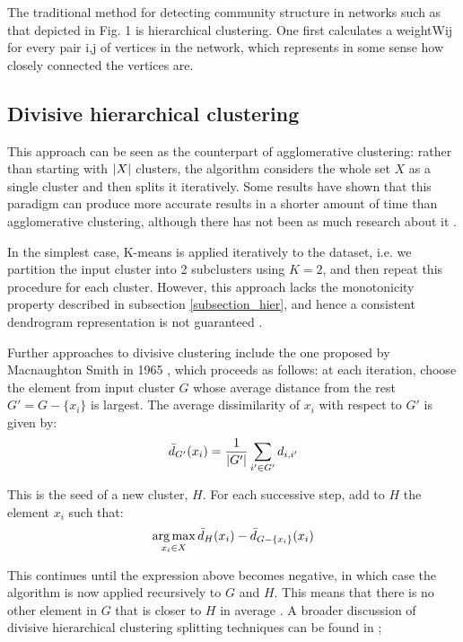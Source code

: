 \documentclass[../main.tex]{subfiles} \label{chapter_soa}
\begin{document}
The traditional method for detecting community structure in networks such as that depicted in Fig. 1 is
hierarchical clustering. One first calculates a weightWij for every
pair i,j of vertices in the network, which represents in some sense
how closely connected the vertices are.

\subsection{Divisive hierarchical clustering} \label{subsection_divisive}
This approach can be seen as the counterpart of agglomerative clustering: rather than starting with $\lvert X\rvert$ clusters, the algorithm considers the whole set $X$ as a single cluster and then splits it iteratively. Some results have shown that this paradigm can produce more accurate results in a shorter amount of time than agglomerative clustering, although there has not been as much research about it \cite{Manning2009}.  
\par In the simplest case, K-means is applied iteratively to the dataset, i.e. we partition the input cluster into 2 subclusters using $K=2$, and then repeat this procedure for each cluster. However, this approach lacks the monotonicity property described in subsection \ref{subsection_hier}, and hence a consistent dendrogram representation is not guaranteed \cite{hastie2008}.
\par Further approaches to divisive clustering include the one proposed by Macnaughton Smith in 1965 \cite{hastie2008}, which proceeds as follows: at each iteration, choose the element from input cluster $G$ whose average distance from the rest $G' = G - \{x_i\}$ is largest. The average dissimilarity of $x_i$ with respect to $G'$ is given by:
\begin{align*}
\bar{d}_{G'}(x_i) = \frac{1}{\lvert G'\rvert}\sum_{i'\in G'} d_{i,i'}
\end{align*}
\par This is the seed of a new cluster, $H$. For each successive step, add to $H$ the element $x_i$ such that:
\begin{align*}
\operatorname*{arg\,max}_{x_i \in X} \bar{d}_H(x_i) - \bar{d}_{G-\{x_i\}}(x_i)
\end{align*}
\par This continues until the expression above becomes negative, in which case the algorithm is now applied recursively to $G$ and $H$. This means that there is no other element in $G$ that is closer to $H$ in average \cite{hastie2008}. A broader discussion of divisive hierarchical clustering splitting techniques can be found in \cite{.2006};
\end{document}
